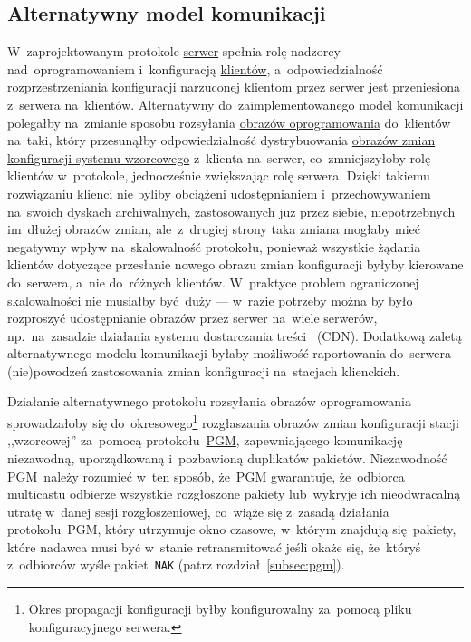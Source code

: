 \documentclass[thesis]{subfiles}
\begin{document}

\subsection{Alternatywny model komunikacji}

W~zaprojektowanym protokole \hyperref[sec:srv-app]{serwer} spełnia rolę nadzorcy nad~oprogramowaniem i~konfiguracją \hyperref[sec:cli-app]{klientów}, a~odpowiedzialność rozprzestrzeniania konfiguracji narzuconej klientom przez serwer jest przeniesiona z~serwera na~klientów. Alternatywny do~zaimplementowanego model komunikacji polegałby na~zmianie sposobu rozsyłania \hyperref[sec:obraz-zmian-konfiguracji]{obrazów oprogramowania} do~klientów na~taki, który przesunąłby odpowiedzialność dystrybuowania \hyperref[sec:obraz-zmian-konfiguracji]{obrazów zmian konfiguracji systemu wzorcowego} z~klienta na~serwer, co~zmniejszyłoby rolę klientów w~protokole, jednocześnie zwiększając rolę serwera. Dzięki takiemu rozwiązaniu klienci nie byliby obciążeni udostępnianiem i~przechowywaniem na~swoich dyskach archiwalnych, zastosowanych już przez siebie, niepotrzebnych im~dłużej obrazów zmian, ale~z~drugiej strony taka zmiana mogłaby mieć negatywny wpływ na~skalowalność protokołu, ponieważ wszystkie żądania klientów dotyczące przesłanie nowego obrazu zmian konfiguracji byłyby kierowane do~serwera, a~nie do~różnych klientów. W~praktyce problem ograniczonej skalowalności nie musiałby być duży --- w~razie potrzeby można by było rozproszyć udostępnianie obrazów przez serwer na~wiele serwerów, np.~na~zasadzie działania systemu dostarczania treści ~(CDN). Dodatkową zaletą alternatywnego modelu komunikacji byłaby możliwość raportowania do~serwera (nie)powodzeń zastosowania zmian konfiguracji na~stacjach klienckich.

Działanie alternatywnego protokołu rozsyłania obrazów oprogramowania sprowadzałoby się do~okresowego\footnote{Okres propagacji konfiguracji byłby konfigurowalny za~pomocą pliku konfiguracyjnego serwera.} rozgłaszania obrazów zmian konfiguracji stacji ,,wzorcowej'' za~pomocą protokołu~\hyperref[subsec:pgm]{PGM}, zapewniającego komunikację niezawodną, uporządkowaną i~pozbawioną duplikatów pakietów. Niezawodność PGM~należy rozumieć w~ten sposób, że~PGM gwarantuje, że~odbiorca multicastu odbierze wszystkie rozgłoszone pakiety lub~wykryje ich nieodwracalną utratę w~danej sesji rozgłoszeniowej, co~wiąże się z~zasadą działania protokołu~PGM, który utrzymuje okno czasowe, w~którym znajdują się~pakiety, które nadawca musi być w~stanie retransmitować jeśli okaże się, że~któryś z~odbiorców wyśle pakiet~\texttt{NAK} (patrz rozdział~\ref{subsec:pgm}).
\end{document}
